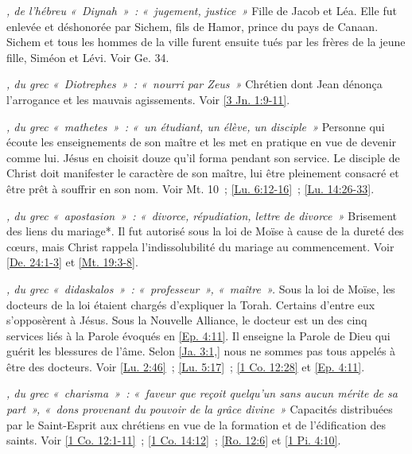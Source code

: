 \begin{multicols}{2}
\textit{, de l'hébreu «~Diynah~»~: «~jugement, justice~»}\newline
Fille de Jacob et Léa. Elle fut enlevée et déshonorée par Sichem, fils de Hamor, prince du pays de Canaan. Sichem et tous les hommes de la ville furent ensuite tués par les frères de la jeune fille, Siméon et Lévi. Voir Ge. 34.

\textit{, du grec «~Diotrephes~»~: «~nourri par Zeus~»}\newline
Chrétien dont Jean dénonça l'arrogance et les mauvais agissements. Voir \vref{3 Jn. 1:9-11}.

\textit{, du grec «~mathetes~»~: «~un étudiant, un élève, un disciple~»}\newline
Personne qui écoute les enseignements de son maître et les met en pratique en vue de devenir comme lui. Jésus en choisit douze qu'il forma pendant son service. Le disciple de Christ doit manifester le caractère de son maître, lui être pleinement consacré et être prêt à souffrir en son nom. Voir Mt. 10~; \vref{Lu. 6:12-16}~; \vref{Lu. 14:26-33}.

\textit{, du grec «~apostasion~»~: «~divorce, répudiation, lettre de divorce~»}\newline
Brisement des liens du mariage*. Il fut autorisé sous la loi de Moïse à cause de la dureté des cœurs, mais Christ rappela l'indissolubilité du mariage au commencement. Voir \vref{De. 24:1-3} et \vref{Mt. 19:3-8}.

\textit{, du grec «~didaskalos~»~: «~professeur~», «~maître~».}\newline
Sous la loi de Moïse, les docteurs de la loi étaient chargés d'expliquer la Torah. Certains d'entre eux s'opposèrent à Jésus. Sous la Nouvelle Alliance, le docteur est un des cinq services liés à la Parole évoqués en \vref{Ep. 4:11}. Il enseigne la Parole de Dieu qui guérit les blessures de l'âme. Selon \vref{Ja. 3:1,} nous ne sommes pas tous appelés à être des docteurs. Voir \vref{Lu. 2:46}~; \vref{Lu. 5:17}~; \vref{1 Co. 12:28} et \vref{Ep. 4:11}.

\textit{, du grec «~charisma~»~: «~faveur que reçoit quelqu'un sans aucun mérite de sa part~», «~dons provenant du pouvoir de la grâce divine~»}\newline
Capacités distribuées par le Saint-Esprit aux chrétiens en vue de la formation et de l'édification des saints. Voir \vref{1 Co. 12:1-11}~; \vref{1 Co. 14:12}~; \vref{Ro. 12:6} et \vref{1 Pi. 4:10}.


\end{multicols}
